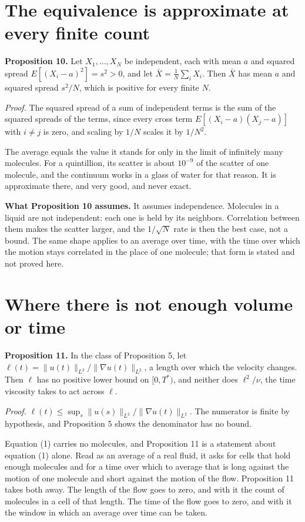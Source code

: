 \section{The equivalence is approximate at every finite count}

\textbf{Proposition 10.} Let $X_1,\dots,X_N$ be independent, each with mean $a$ and squared spread
$E[(X_i-a)^2] = s^2 > 0$, and let $\bar X = \tfrac1N\sum_i X_i$. Then $\bar X$ has mean $a$ and
squared spread $s^2/N$, which is positive for every finite $N$.

\emph{Proof.} The squared spread of a sum of independent terms is the sum of the squared spreads of the terms, since every
cross term $E[(X_i-a)(X_j-a)]$ with $i\neq j$ is zero, and scaling by $1/N$ scales it by $1/N^2$.
\hfill\qedsymbol

The average equals the value it stands for only in the limit of infinitely many molecules. For a
quintillion, its scatter is about $10^{-9}$ of the scatter of one molecule, and the continuum
works in a glass of water for that reason. It is approximate there, and very good, and never
exact.

\textbf{What Proposition 10 assumes.} It assumes independence. Molecules in a liquid are not
independent: each one is held by its neighbors. Correlation between them makes the scatter larger,
and the $1/\sqrt N$ rate is then the best case, not a bound. The same shape applies to an average
over time, with the time over which the motion stays correlated in the place of one molecule; that
form is stated and not proved here.

\section{Where there is not enough volume or time}

\textbf{Proposition 11.} In the class of Proposition 5, let
$\ell(t) = \|u(t)\|_{L^2}/\|\nabla u(t)\|_{L^2}$, a length over which the velocity changes. Then
$\ell$ has no positive lower bound on $[0,T^*)$, and neither does $\ell^2/\nu$, the time viscosity
takes to act across $\ell$.

\emph{Proof.} $\ell(t) \le \sup_s\|u(s)\|_{L^2}/\|\nabla u(t)\|_{L^2}$. The numerator is finite by
hypothesis, and Proposition 5 shows the denominator has no bound. \hfill\qedsymbol

Equation (1) carries no molecules, and Proposition 11 is a statement about equation (1) alone.
Read as an average of a real fluid, it asks for cells that hold enough molecules and for a time
over which to average that is long against the motion of one molecule and short against the motion
of the flow. Proposition 11 takes both away. The length of the flow goes to zero, and with it the
count of molecules in a cell of that length. The time of the flow goes to zero, and with it the
window in which an average over time can be taken.

